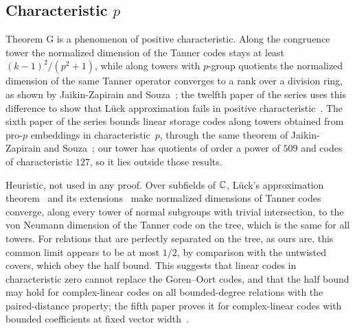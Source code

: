 \subsection{Characteristic \texorpdfstring{$p$}{p}}\label{sec:limits-char}

Theorem G is a phenomenon of positive characteristic. Along the congruence tower the normalized dimension of the Tanner
codes stays at least $(k-1)^2/(p^2+1)$, while along towers with $p$-group quotients the normalized dimension of the same Tanner
operator converges to a rank over a division ring, as shown by Jaikin-Zapirain and Souza~\cite[Theorem~8.1]{JaikinSouza2026};
the twelfth paper of the series uses this difference to show that L\"uck approximation fails in positive
characteristic~\cite{Luck2026}. The sixth paper of the series bounds linear storage codes along towers obtained from pro-$p$
embeddings in characteristic~$p$, through the same theorem of Jaikin-Zapirain and Souza~\cite{Covers2026}; our tower has
quotients of order a power of $509$ and codes of characteristic $127$, so it lies outside those results.

\begin{remark}\label{rem:char0}
Heuristic, not used in any proof. Over subfields of $\mathbb{C}$, L\"uck's approximation theorem~\cite{Luck1994} and its
extensions~\cite[Section~1 and Theorem~10.1]{JaikinSurvey2019} make
normalized dimensions of Tanner codes converge, along every tower of normal subgroups with trivial intersection, to the
von Neumann dimension of the Tanner code on the tree, which is the same for all towers. For relations that are perfectly
separated on the tree, as ours are, this common limit appears to be at most $1/2$, by comparison with the untwisted
covers, which obey the half bound. This suggests that linear codes in characteristic zero cannot replace the
Goren--Oort codes, and that the half bound may hold for complex-linear codes on all bounded-degree relations with the
paired-distance property; the fifth paper proves it for complex-linear codes with bounded coefficients at fixed vector
width~\cite[Theorem~4.5]{DirectedRecovery2026}.
\end{remark}

